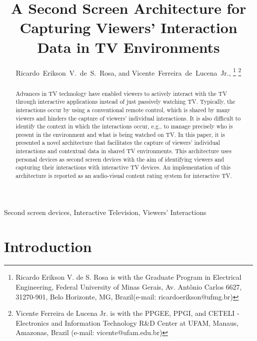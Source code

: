 \documentclass[journal]{IEEEtran}
\begin{document}
\title{A Second Screen Architecture for Capturing Viewers' Interaction Data in TV Environments}
\author{Ricardo~Erikson~V.~de~S.~Rosa, 
	and Vicente~Ferreira~de~Lucena~Jr.,
\thanks{Ricardo Erikson V. de S. Rosa is with the Graduate Program in Electrical Engineering, Federal University of Minas Gerais, Av. Antônio Carlos 6627, 31270-901, Belo Horizonte, MG, Brazil(e-mail: ricardoerikson@ufmg.br)}%
\thanks{Vicente Ferreira de Lucena Jr. is with the PPGEE, PPGI, and CETELI - Electronics and Information Technology R\&D Center at UFAM, Manaus, Amazonas, Brazil (e-mail: vicente@ufam.edu.br)}%
}

\maketitle

\begin{abstract}
Advances in TV technology have enabled viewers to actively interact with the TV through interactive applications instead of just passively watching TV. Typically, the interactions occur by using a conventional remote control, which is shared by many viewers and hinders the capture of viewers' individual interactions. It is also difficult to identify the context in which the interactions occur, e.g., to manage precisely who is present in the environment and what is being watched on TV. In this paper, it is presented a novel architecture that facilitates the capture of viewers' individual interactions and contextual data in shared TV environments. This architecture uses personal devices as second screen devices with the aim of identifying viewers and capturing their interactions with interactive TV devices. An implementation of this architecture is reported as an audio-visual content rating system for interactive TV.
\end{abstract}

\begin{IEEEkeywords}
Second screen devices, Interactive Television, Viewers' Interactions
\end{IEEEkeywords}

\IEEEpeerreviewmaketitle

\section{Introduction}
\end{document}
